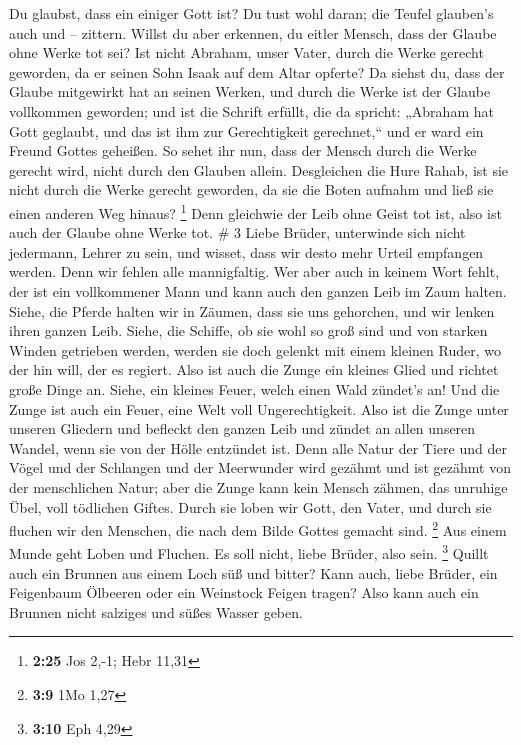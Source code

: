  Du glaubst, dass ein einiger Gott ist? Du tust wohl
daran; die Teufel glauben's auch und -- zittern.  Willst
du aber erkennen, du eitler Mensch, dass der Glaube ohne Werke tot sei?
 Ist nicht Abraham, unser Vater, durch die Werke gerecht
geworden, da er seinen Sohn Isaak auf dem Altar opferte? 
Da siehst du, dass der Glaube mitgewirkt hat an seinen Werken, und durch
die Werke ist der Glaube vollkommen geworden;  und ist
die Schrift erfüllt, die da spricht: „Abraham hat Gott geglaubt, und das
ist ihm zur Gerechtigkeit gerechnet,`` und er ward ein Freund Gottes
geheißen.  So sehet ihr nun, dass der Mensch durch die
Werke gerecht wird, nicht durch den Glauben allein. 
Desgleichen die Hure Rahab, ist sie nicht durch die Werke gerecht
geworden, da sie die Boten aufnahm und ließ sie einen anderen Weg
hinaus? \footnote{\textbf{2:25} Jos 2,-1; Hebr 11,31} 
Denn gleichwie der Leib ohne Geist tot ist, also ist auch der Glaube
ohne Werke tot. \# 3  Liebe Brüder, unterwinde sich nicht
jedermann, Lehrer zu sein, und wisset, dass wir desto mehr Urteil
empfangen werden.  Denn wir fehlen alle mannigfaltig. Wer
aber auch in keinem Wort fehlt, der ist ein vollkommener Mann und kann
auch den ganzen Leib im Zaum halten.  Siehe, die Pferde
halten wir in Zäumen, dass sie uns gehorchen, und wir lenken ihren
ganzen Leib.  Siehe, die Schiffe, ob sie wohl so groß sind
und von starken Winden getrieben werden, werden sie doch gelenkt mit
einem kleinen Ruder, wo der hin will, der es regiert. 
Also ist auch die Zunge ein kleines Glied und richtet große Dinge an.
Siehe, ein kleines Feuer, welch einen Wald zündet's an! 
Und die Zunge ist auch ein Feuer, eine Welt voll Ungerechtigkeit. Also
ist die Zunge unter unseren Gliedern und befleckt den ganzen Leib und
zündet an allen unseren Wandel, wenn sie von der Hölle entzündet ist.
 Denn alle Natur der Tiere und der Vögel und der Schlangen
und der Meerwunder wird gezähmt und ist gezähmt von der menschlichen
Natur;  aber die Zunge kann kein Mensch zähmen, das
unruhige Übel, voll tödlichen Giftes.  Durch sie loben wir
Gott, den Vater, und durch sie fluchen wir den Menschen, die nach dem
Bilde Gottes gemacht sind. \footnote{\textbf{3:9} 1Mo 1,27}
 Aus einem Munde geht Loben und Fluchen. Es soll nicht,
liebe Brüder, also sein. \footnote{\textbf{3:10} Eph 4,29}
 Quillt auch ein Brunnen aus einem Loch süß und bitter?
 Kann auch, liebe Brüder, ein Feigenbaum Ölbeeren oder
ein Weinstock Feigen tragen? Also kann auch ein Brunnen nicht salziges
und süßes Wasser geben.

